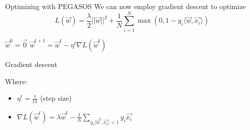 \begin{frame}{Optimizing with PEGASOS}
We can now employ gradient descent to optimize
\begin{equation*}
L(\vec{w}) = \frac{\lambda}{2}||\vec{w}||^2 + \frac{1}{N} \sum_{i=1}^N \max(0, 1-y_i\langle\vec{w}, \vec{x_i}\rangle)
\end{equation*}
\begin{algorithm}[H]
\begin{algorithmic}[1]
\STATE $\vec{w}^0 = \vec{0}$
\STATE $\vec{w}^{t+1}=\vec{w}^t-\eta^t\nabla L(\vec{w}^t)$
\ENDFOR
\end{algorithmic}
\caption{Gradient descent}
\label{alg:train}
\end{algorithm}
\vspace{-1.5em} Where:
\begin{itemize}
\item $\eta^t = \frac{1}{t \lambda}$ (step size)
\item $\nabla L(\vec{w}^t) = \lambda \vec{w}^t - \frac{1}{N}\sum_{y_i\langle\vec{w}^t,\vec{x_i}\rangle < 1}y_i \vec{x_i}$ 
\end{itemize}
\end{frame}